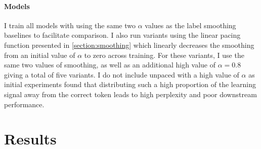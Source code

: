 \paragraph{Models} I train all models with \smoothing using the same two $\alpha$ values as the label smoothing baselines to facilitate comparison. I also run variants using the linear pacing function presented in \cref{section:smoothing} which linearly decreases the smoothing from an initial value of $\alpha$ to zero across training. For these variants, I use the same two values of smoothing, as well as an additional high value of $\alpha=0.8$ giving a total of five \smoothing variants. I do not include unpaced \smoothing with a high value of $\alpha$ as initial experiments found that distributing such a high proportion of the learning signal away from the correct token leads to high perplexity and poor downstream performance.

\section{Results}
\label{sec:results}

